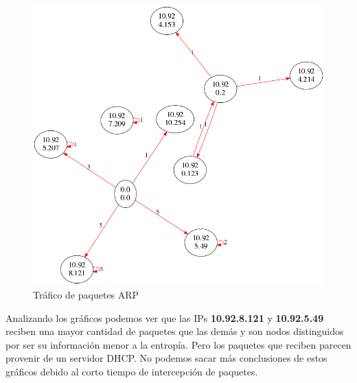 \begin{figure}[H]
       \centering
       \includegraphics[width=1\textwidth]{../resultados/subte/network.png}
       \caption{Tráfico de paquetes ARP}
       \label{red-Starbucks-dst-information}
\end{figure}

Analizando los gráficos podemos ver que las IPs \textbf{10.92.8.121} y \textbf{10.92.5.49} reciben una mayor cantidad de paquetes que las demás y son nodos distinguidos por ser su información menor a la entropía. Pero los paquetes que reciben parecen provenir de un servidor DHCP. No podemos sacar más conclusiones de estos gráficos debido al corto tiempo de intercepción de paquetes.\\